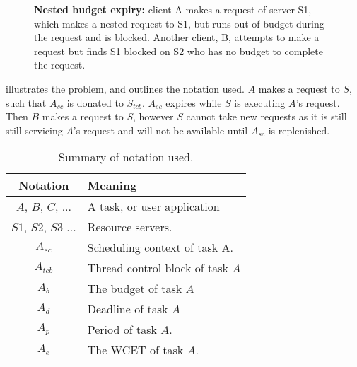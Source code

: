 \begin{figure}
    \centering
\caption{\textbf{Nested budget expiry:} client A makes a request of server S1, which makes a nested request to S1, but runs out of budget during the request and is blocked. Another client, B, attempts to make a request but finds S1 blocked on S2 who has no budget to complete the request.}
\label{fig:nested-budget-expiry}
\end{figure}

 illustrates the problem, and  outlines the notation used.
$A$ makes a request to $S$, such that $A_{sc}$ is donated to $S_{tcb}$.
$A_{sc}$ expires while $S$ is executing $A$'s request.
Then $B$ makes a request to $S$, however $S$ cannot take new requests as it is still still servicing $A$'s request and will not be available until $A_{sc}$ is replenished.

\begin{table}
	\centering
	\begin{tabular}{| c | l |} \hline
    \textbf{Notation} &  \textbf{Meaning}                           \\\hline
       $A$, $B$, $C$, ...   & A task, or user application           \\\hline
	   $S1$, $S2$, $S3$ ... & Resource servers.                     \\\hline
	   $A_{sc}$             & Scheduling context of task A.         \\\hline
	   $A_{tcb}$            & Thread control block of task $A$ \\\hline
	   $A_{b}$              & The budget of task $A$ \\\hline
       $A_{d}$              & Deadline of task $A$                  \\\hline
	   $A_{p}$              & Period of task $A$.                   \\\hline
       $A_{e}$              & The \gls{WCET} of task $A$. \\\hline
     \end{tabular}
	 \caption{Summary of notation used.}
	 \label{tab:notation}
\end{table}

